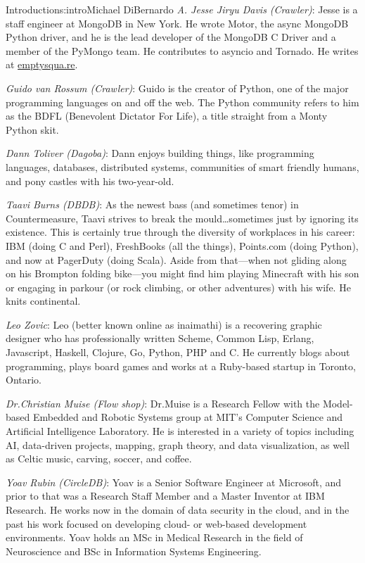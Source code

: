\begin{aosachapter}{Introduction}{s:intro}{Michael DiBernardo}
\emph{A. Jesse Jiryu Davis (Crawler)}: Jesse is a staff engineer at MongoDB in New York. He wrote Motor, the async MongoDB Python driver, and he is the lead developer of the MongoDB C Driver and a member of the PyMongo team. He contributes to asyncio and Tornado. He writes at \url{emptysqua.re}.

\emph{Guido van Rossum (Crawler)}: Guido is the creator of Python, one of the major programming languages on and off the web. The Python community refers to him as the BDFL (Benevolent Dictator For Life), a title straight from a Monty Python skit. 

\emph{Dann Toliver (Dagoba)}: Dann enjoys building things, like programming languages, databases, distributed systems, communities of smart friendly humans, and pony castles with his two-year-old.

\emph{Taavi Burns (DBDB)}: As the newest bass (and sometimes tenor) in Countermeasure, Taavi strives to break the mould\ldots sometimes just by ignoring its existence. This is certainly true through the diversity of workplaces in his career: IBM (doing C and Perl), FreshBooks (all the things), Points.com (doing Python), and now at PagerDuty (doing Scala).  Aside from that—when not gliding along on his Brompton folding bike—you might find him playing Minecraft with his son or engaging in parkour (or rock climbing, or other adventures) with his wife. He knits continental.

\emph{Leo Zovic}: Leo (better known online as inaimathi) is a recovering graphic designer who has professionally written Scheme, Common Lisp, Erlang, Javascript, Haskell, Clojure, Go, Python, PHP and C. He currently blogs about programming, plays board games and works at a Ruby-based startup in Toronto, Ontario.

\emph{Dr.\@ Christian Muise (Flow shop)}: Dr.\@ Muise is a Research Fellow with the Model-based Embedded and Robotic Systems group at MIT's Computer Science and Artificial Intelligence Laboratory. He is interested in a variety of topics including AI, data-driven projects, mapping, graph theory, and data visualization, as well as Celtic music, carving, soccer, and coffee.

\emph{Yoav Rubin (CircleDB)}: Yoav is a Senior Software Engineer at Microsoft, and prior to that was a Research Staff Member and a Master Inventor at IBM Research. He works now in the domain of data security in the cloud, and in the past his work focused on developing cloud- or web-based development environments. Yoav holds an MSc in Medical Research in the field of Neuroscience and BSc in Information Systems Engineering. 


\end{aosachapter}
